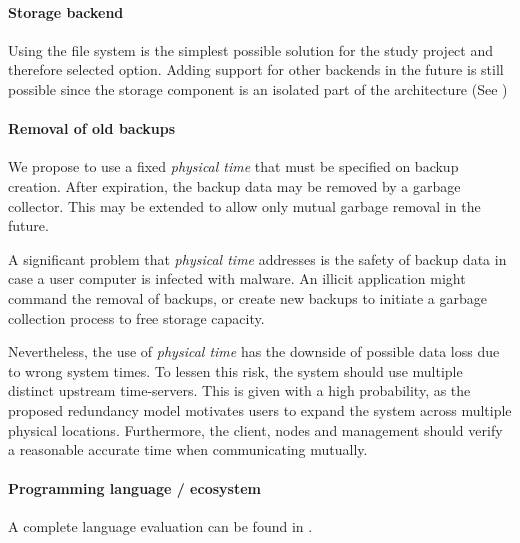 \paragraph{Storage backend}
Using the file system is the simplest possible solution for the study project and therefore selected option. Adding support for other backends in the future is still possible since the storage component is an isolated part of the architecture (See )

\paragraph{Removal of old backups}
We propose to use a fixed \emph{physical time} that must be specified on backup creation. After expiration, the backup data may be removed by a garbage collector. This may be extended to allow only mutual garbage removal in the future.

A significant problem that \emph{physical time} addresses is the safety of backup data in case a user computer is infected with malware. An illicit application might command the removal of backups, or create new backups to initiate a garbage collection process to free storage capacity.

Nevertheless, the use of \emph{physical time} has the downside of possible data loss due to wrong system times. To lessen this risk, the system should use multiple distinct upstream time-servers. This is given with a high probability, as the proposed redundancy model motivates users to expand the system across multiple physical locations. Furthermore, the client, nodes and management should verify a reasonable accurate time when communicating mutually.

\paragraph{Programming language / ecosystem}
A complete language evaluation can be found in .


